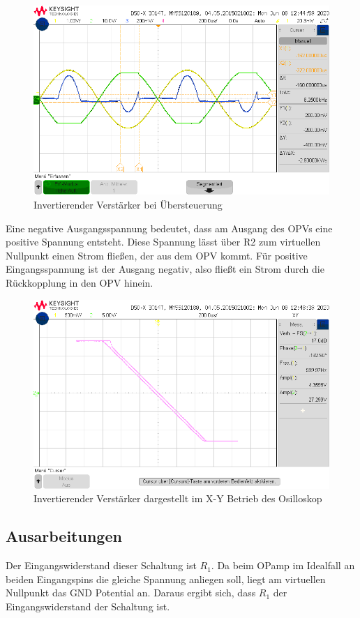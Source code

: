 \begin{figure}[H]
    \centering
    \includegraphics[width=\costumPicWidth]{Lab_1/Messungen/inv_verst/scope_40.png}
    \caption{Invertierender Verstärker bei Übersteuerung}
    \label{fig:uberst_verst}
\end{figure}
Eine negative Ausgangsspannung bedeutet, dass am Ausgang des OPVs eine positive Spannung entsteht. Diese
Spannung lässt über R2 zum virtuellen Nullpunkt einen Strom fließen, der aus dem OPV kommt. Für positive
Eingangsspannung ist der Ausgang negativ, also fließt ein Strom durch die Rückkopplung in den OPV hinein.
\begin{figure}[H]
    \centering
    \includegraphics[width=\costumPicWidth]{Lab_1/Messungen/inv_verst/scope_48.png}
    \caption{Invertierender Verstärker dargestellt im X-Y Betrieb des Osilloskop}
    \label{fig:inv_verst_xy}
\end{figure}

\subsection{Ausarbeitungen}
Der Eingangswiderstand dieser Schaltung ist $R_1$. Da beim OPamp im Idealfall an beiden Eingangspins die gleiche Spannung anliegen soll, liegt am virtuellen Nullpunkt das GND Potential an. Daraus ergibt sich, dass $R_1$ der Eingangswiderstand der Schaltung ist.

